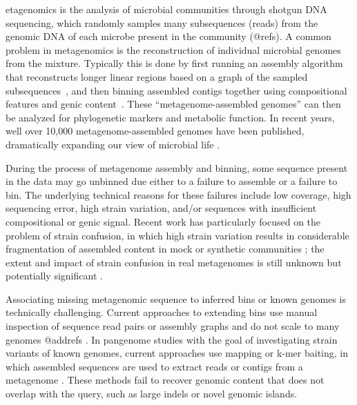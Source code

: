 etagenomics is the analysis of microbial communities through shotgun
DNA sequencing, which randomly samples many subsequences (reads)
from the genomic DNA of each microbe present in the community (@refs).
A common problem in metagenomics is the reconstruction of
individual microbial genomes from the mixture.
Typically this is
done by first running an assembly algorithm that reconstructs
longer linear regions based on a graph of the sampled
subsequences~\cite{pell2012scaling}, and then binning assembled
contigs together using compositional features and genic content~\cite{laczny2017busybee,lin2016accurate}.  These
``metagenome-assembled genomes'' can then be
analyzed for phylogenetic markers and metabolic function. In recent years,
well over 10,000 metagenome-assembled genomes have been published,
dramatically expanding our view of microbial life
\cite{Parks2017,Tully2018,Stewart2018,Delmont2018,Hug2016}.

During the process of metagenome assembly and binning, some
sequence present in the data may go unbinned due either to a failure
to assemble \cite{CAMI,Awad155358} or a failure to bin.
The underlying technical reasons for these failures include low
coverage, high sequencing error, high strain variation, and/or sequences
with insufficient compositional or genic signal.  Recent work has
particularly focused on the problem of strain confusion, in which
high strain variation results in considerable fragmentation of assembled
content in mock or synthetic communities \cite{CAMI,Awad155358}; the
extent and impact of strain confusion in real metagenomes is still unknown
but potentially significant \cite{brownstrain,Brito2016,baltic}.

Associating missing metagenomic sequence to inferred bins or known
genomes is technically challenging.  Current approaches to extending
bins use manual inspection of sequence read pairs or assembly graphs
and do not scale to many
genomes @addrefs \cite{perchlorate,metacherchant}. In pangenome studies with the
goal of investigating strain variants of known genomes,
 current approaches use mapping or k-mer baiting, in which
assembled sequences are used to extract reads or contigs from a
metagenome \cite{desman,Nayfach2016,ekg,mspminer}.
These methods fail to recover genomic content that does not overlap with
the query, such as large indels or novel genomic islands.

